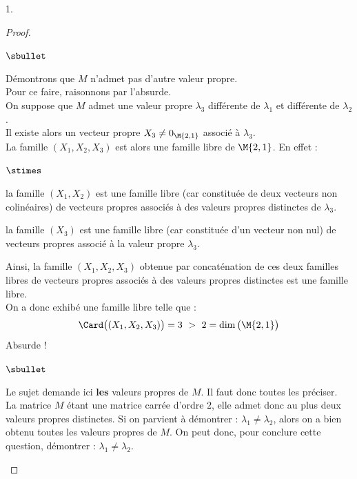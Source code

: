 \begin{noliste}{1.}
\begin{proof}
\begin{noliste}{$\sbullet$}
  \item Démontrons que $M$ n'admet pas d'autre valeur propre.\\
    Pour ce faire, raisonnons par l'absurde.\\
    On suppose que $M$ admet une valeur propre $\lambda_3$ différente
    de $\lambda_1$ et différente de $\lambda_2$.\\
    Il existe alors un vecteur propre $X_3 \neq 0_{\M{2,1}}$ associé à
    $\lambda_3$.\\[.2cm]
    La famille $(X_1, X_2, X_3)$ est alors une famille libre de
    $\M{2,1}$. En effet :
    \begin{noliste}{$\stimes$}
    \item la famille $(X_1, X_2)$ est une famille libre (car
      constituée de deux vecteurs non colinéaires) de vecteurs
      propres associés à des valeurs propres distinctes de $\lambda_3$.
    \item la famille $(X_3)$ est une famille libre (car constituée
      d'un vecteur non nul) de vecteurs propres associé à la valeur
      propre $\lambda_3$.
    \end{noliste}
    Ainsi, la famille $(X_1, X_2, X_3)$ obtenue par concaténation de
    ces deux familles libres de vecteurs propres associés à des
    valeurs propres distinctes est une famille libre.\\
    On a donc exhibé une famille libre telle que : 
    \[
    \Card \big( (X_1, X_2, X_3) \big) = 3 \ > \ 2 = \dim\big(\M{2,1}
    \big)
    \]
    Absurde ! %
  \end{noliste}
  \begin{remarkL}{.97}%
    \begin{noliste}{$\sbullet$}
    \item Le sujet demande ici {\bf les} valeurs propres de $M$. Il
      faut donc toutes les préciser.\\
      La matrice $M$ étant une matrice carrée d'ordre $2$, elle admet
      donc au plus deux valeurs propres distinctes. Si on parvient à
      démontrer : $\lambda_1 \neq \lambda_2$, alors on a bien obtenu
      toutes les valeurs propres de $M$. On peut donc, pour conclure
      cette question, démontrer : $\lambda_1 \neq \lambda_2$.\\

\end{noliste}
\end{remarkL}
\end{proof}
\end{noliste}
